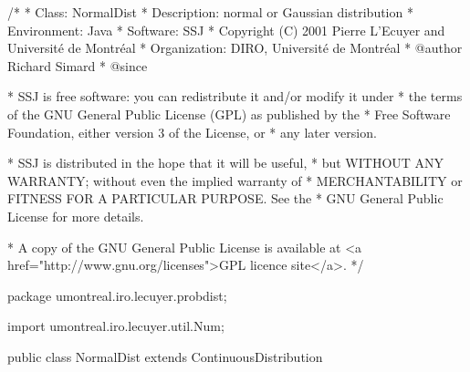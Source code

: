 \begin{code}
\begin{hide}
/*
 * Class:        NormalDist
 * Description:  normal or Gaussian distribution
 * Environment:  Java
 * Software:     SSJ 
 * Copyright (C) 2001  Pierre L'Ecuyer and Université de Montréal
 * Organization: DIRO, Université de Montréal
 * @author       Richard Simard
 * @since

 * SSJ is free software: you can redistribute it and/or modify it under
 * the terms of the GNU General Public License (GPL) as published by the
 * Free Software Foundation, either version 3 of the License, or
 * any later version.

 * SSJ is distributed in the hope that it will be useful,
 * but WITHOUT ANY WARRANTY; without even the implied warranty of
 * MERCHANTABILITY or FITNESS FOR A PARTICULAR PURPOSE.  See the
 * GNU General Public License for more details.

 * A copy of the GNU General Public License is available at
   <a href="http://www.gnu.org/licenses">GPL licence site</a>.
 */
\end{hide}
package umontreal.iro.lecuyer.probdist;\begin{hide}
import umontreal.iro.lecuyer.util.Num;\end{hide}

public class NormalDist extends ContinuousDistribution\begin{hide} {
   protected double mu;
   protected double sigma;
   protected static final double RAC2PI = 2.50662827463100050; // Sqrt(2*Pi)

   private static final double[]  AbarF = {
         6.10143081923200418E-1,
         -4.34841272712577472E-1,
         1.76351193643605501E-1,
         -6.07107956092494149E-2,
         1.77120689956941145E-2,
         -4.32111938556729382E-3,
         8.54216676887098679E-4,
         -1.27155090609162743E-4,
         1.12481672436711895E-5,
         3.13063885421820973E-7,
         -2.70988068537762022E-7,
         3.07376227014076884E-8,
         2.51562038481762294E-9,
         -1.02892992132031913E-9,
         2.99440521199499394E-11,
         2.60517896872669363E-11,
         -2.63483992417196939E-12,
         -6.43404509890636443E-13,
         1.12457401801663447E-13,
         1.7281533389986098E-14,
         -4.2641016949424E-15,
         -5.4537197788E-16,
         1.5869760776E-16,
         2.08998378E-17,
         -0.5900E-17
      };

\end{hide}
\end{code}
